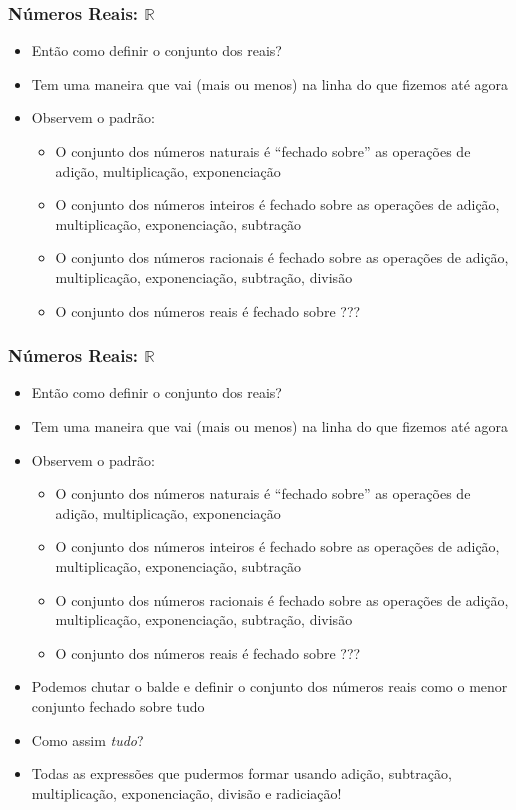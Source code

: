 \documentclass[usenames,dvipsnames,svgnames]{beamer}
\begin{document}
\begin{frame}
	
	\frametitle{Números Reais: $\mathbb{R}$}

	\begin{itemize}
		\item Então como definir o conjunto dos reais?
		\item Tem uma maneira que vai (mais ou menos) na linha do que fizemos até agora
		\item Observem o padrão:
		\begin{itemize}
			\item O conjunto dos números naturais é ``fechado sobre'' as operações de adição, multiplicação, exponenciação
			\item O conjunto dos números inteiros é fechado sobre as operações de adição, multiplicação, exponenciação, subtração
			\item O conjunto dos números racionais é fechado sobre as operações de adição, multiplicação, exponenciação, subtração, divisão
			\item O conjunto dos números reais é fechado sobre {\color{red}???}
		\end{itemize}
	\end{itemize}

\end{frame}

\begin{frame}
	
	\frametitle{Números Reais: $\mathbb{R}$}

	\begin{itemize}
		\item Então como definir o conjunto dos reais?
		\item Tem uma maneira que vai (mais ou menos) na linha do que fizemos até agora
		\item Observem o padrão:
		\begin{itemize}
			\item O conjunto dos números naturais é ``fechado sobre'' as operações de adição, multiplicação, exponenciação
			\item O conjunto dos números inteiros é fechado sobre as operações de adição, multiplicação, exponenciação, subtração
			\item O conjunto dos números racionais é fechado sobre as operações de adição, multiplicação, exponenciação, subtração, divisão
			\item O conjunto dos números reais é fechado sobre {\color{red}???}
		\end{itemize}
		\item Podemos chutar o balde e definir o conjunto dos números reais como o menor conjunto fechado sobre {\color{red}tudo}
		\item Como assim \emph{tudo}?
		\item Todas as expressões que pudermos formar usando adição, subtração, multiplicação, exponenciação, divisão e radiciação! 
	\end{itemize}

\end{frame}
\end{document}
